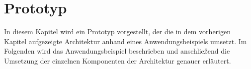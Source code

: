 \section{Prototyp}\label{sec:umsetzung}
In diesem Kapitel wird ein Prototyp vorgestellt, der die in dem vorherigen Kapitel aufgezeigte Architektur anhand eines Anwendungsbeispiels umsetzt. Im Folgenden wird das Anwendungsbeispiel beschrieben und anschließend die Umsetzung der einzelnen Komponenten der Architektur genauer erläutert.









